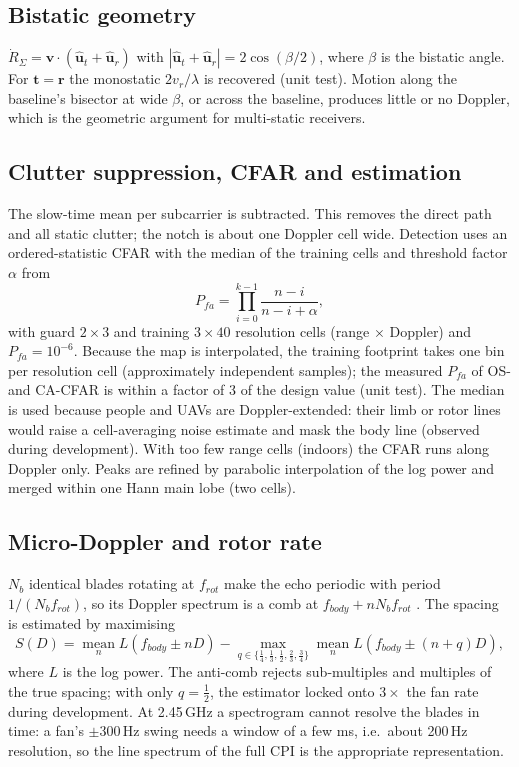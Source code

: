 \documentclass[10pt,a4paper]{article}
\begin{document}
\subsection{Bistatic geometry}
$\dot R_\Sigma=\mathbf v\cdot(\hat{\mathbf u}_t+\hat{\mathbf u}_r)$ with $|\hat{\mathbf u}_t+\hat{\mathbf
u}_r|=2\cos(\beta/2)$, where $\beta$ is the bistatic angle. For $\mathbf t=\mathbf r$ the monostatic $2v_r/\lambda$
is recovered (unit test). Motion along the baseline's bisector at wide $\beta$, or across the baseline, produces
little or no Doppler, which is the geometric argument for multi-static receivers.

\subsection{Clutter suppression, CFAR and estimation}
The slow-time mean per subcarrier is subtracted. This removes the direct path and all static clutter; the notch
is about one Doppler cell wide. Detection uses an ordered-statistic CFAR \cite{rohling1983} with the median of the
training cells and threshold factor $\alpha$ from
\begin{equation}
P_{fa}=\prod_{i=0}^{k-1}\frac{n-i}{n-i+\alpha},
\end{equation}
with guard $2\times3$ and training $3\times40$ resolution cells (range $\times$ Doppler) and $P_{fa}=10^{-6}$. Because
the map is interpolated, the training footprint takes one bin per resolution cell (approximately independent
samples); the measured $P_{fa}$ of OS- and CA-CFAR is within a factor of 3 of the design value (unit test). The
median is used because people and UAVs are Doppler-extended: their limb or rotor lines would raise a
cell-averaging noise estimate and mask the body line (observed during development). With too few range cells
(indoors) the CFAR runs along Doppler only. Peaks are refined by parabolic interpolation of the log power and
merged within one Hann main lobe (two cells).

\subsection{Micro-Doppler and rotor rate}
$N_b$ identical blades rotating at $f_{rot}$ make the echo periodic with period $1/(N_bf_{rot})$, so its Doppler
spectrum is a comb at $f_{body}+nN_bf_{rot}$ \cite{chen2011}. The spacing is estimated by maximising
\begin{equation}
S(D)=\operatorname*{mean}_n L(f_{body}\pm nD)-\max_{q\in\{\frac14,\frac13,\frac12,\frac23,\frac34\}}
\operatorname*{mean}_n L\!\left(f_{body}\pm(n+q)D\right),
\end{equation}
where $L$ is the log power. The anti-comb rejects sub-multiples and multiples of the true spacing; with only
$q=\tfrac12$, the estimator locked onto $3\times$ the fan rate during development. At 2.45\,GHz a spectrogram
cannot resolve the blades in time: a fan's $\pm300$\,Hz swing needs a window of a few ms, i.e.\ about 200\,Hz
resolution, so the line spectrum of the full CPI is the appropriate representation.
\end{document}
